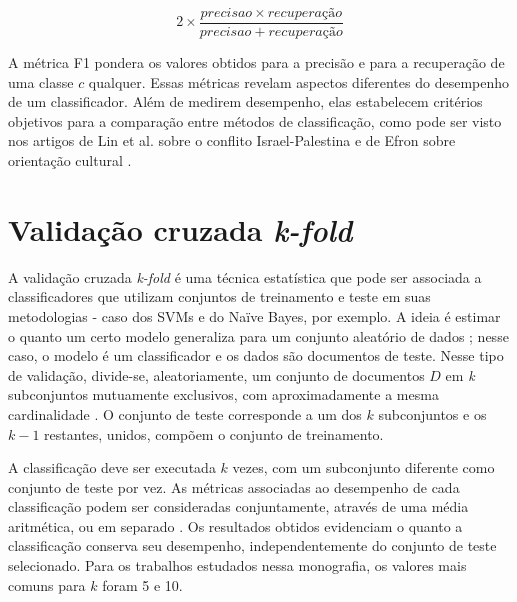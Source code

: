 \begin{equation}
\label{f1measure}
\ensuremath{2 \times \frac{precisao \times recuperação}{precisao + recuperação}}
\end{equation} 


A métrica F1 pondera os valores obtidos para a precisão e para a recuperação de uma classe \ensuremath{c} qualquer. Essas métricas revelam aspectos diferentes do desempenho de um classificador. Além de medirem desempenho, elas estabelecem critérios objetivos para a comparação entre métodos de classificação, como pode ser visto nos artigos de Lin et al. sobre o conflito Israel-Palestina \cite{lin-et-al2006} e de Efron sobre orientação cultural \cite{efron}. 


\section{Validação cruzada \emph{k-fold}}
\label{validacao}

A validação cruzada \emph{k-fold} é uma técnica estatística que pode ser associada a classificadores que utilizam conjuntos de treinamento e teste em suas metodologias - caso dos SVMs e do Naïve Bayes, por exemplo. A ideia é estimar o quanto um certo modelo generaliza para um conjunto aleatório de dados \cite{payam-leitang}; nesse caso, o modelo é um classificador e os dados são documentos de teste. Nesse tipo de validação, divide-se, aleatoriamente, um conjunto de documentos \ensuremath{D} em \emph{k} subconjuntos mutuamente exclusivos, com aproximadamente a mesma cardinalidade  \cite{ron-kohavi}. O conjunto de teste corresponde a um dos \ensuremath{k} subconjuntos e os \ensuremath{k - 1} restantes, unidos, compõem o conjunto de treinamento.

A classificação deve ser executada \ensuremath{k} vezes, com um subconjunto diferente como conjunto de teste por vez. As métricas associadas ao desempenho de cada classificação podem ser consideradas conjuntamente, através de uma média aritmética, ou em separado \cite{payam-leitang}. Os resultados obtidos evidenciam o quanto a classificação conserva seu desempenho, independentemente do conjunto de teste selecionado. Para os trabalhos estudados nessa monografia, os valores mais comuns para \ensuremath{k} foram 5 e 10. 

